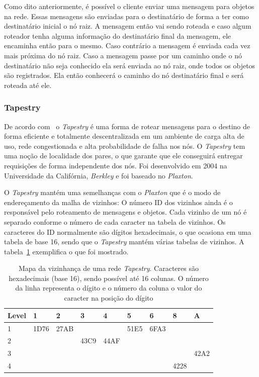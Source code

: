 Como dito anteriormente, é possível o cliente enviar uma mensagem para objetos na rede. Essas mensagens são enviadas para o destinatário de forma a ter como destinatário inicial o nó raiz. A mensagem então vai sendo roteada e caso algum roteador tenha alguma informação do destinatário final da mensagem, ele encaminha então para o mesmo. Caso contrário a mensagem é enviada cada vez mais próxima do nó raiz. Caso a mensagem passe por um caminho onde o nó destinatário não seja conhecido ela será enviada ao nó raiz, onde todos os objetos são registrados. Ela então conhecerá o caminho do nó destinatário final e será roteada até ele.

\subsubsection{Tapestry}

De acordo com~\cite{rowstron01} o \emph{Tapestry} é uma forma de rotear mensagens para o destino de forma eficiente e totalmente descentralizada em um ambiente de carga alta de uso, rede congestionada e alta probabilidade de falha nos nós. O \emph{Tapestry} tem uma noção de localidade dos pares, o que garante que ele conseguirá entregar requisições de forma independente dos nós. Foi desenvolvido em 2004 na Universidade da Califórnia, \emph{Berkley} e foi baseado no \emph{Plaxton}.

O \emph{Tapestry} mantém uma semelhanças com o \emph{Plaxton} que é o modo de endereçamento da malha de vizinhos: O número ID dos vizinhos ainda é o responsável pelo roteamento de mensagens e objetos. Cada vizinho de um nó é separado conforme o número de cada caracter na tabela de vizinhos. Os caracteres do ID normalmente são dígitos hexadecimais, o que ocasiona em uma tabela de base 16, sendo que o \emph{Tapestry} mantém várias tabelas de vizinhos. A tabela~\ref{mapa_vizinhaca_tapestry} exemplifica o que foi mostrado.

\begin{table}
	\begin{tabular}{|p{2cm} |p{1cm} |p{1cm} |p{1cm} |p{1cm} |p{1cm} |p{1cm} |p{1cm} |p{1cm}|}
		\hline
		\textbf{Level}	& \textbf{1} & \textbf{2} & \textbf{3}  & \textbf{4}  & \textbf{5}  & \textbf{6} & \textbf{8} & \textbf{A}	\\
		\hline
				1 		& 1D76 		 & 27AB 	  &  			&  			  &		51E5	&	6FA3	 &			  &	            \\
		\hline
				2 		& 	 		 & 		 	  &  43C9		&  	44AF	  &				&			 &			  &	            \\
		\hline
				3 		& 	 		 & 		 	  &  			&  			  &				&			 &			  &	   42A2     \\
		\hline
				4 		& 	 		 & 			  &  			&  			  &				&			 &		4228  &	            \\
		\hline
	\end{tabular}
	\caption{Mapa da vizinhança de uma rede \emph{Tapestry}. Caracteres são hexadecimais (base 16), sendo possível até 16 colunas. O número da linha representa o dígito e o número da coluna o valor do caracter na posição do dígito}
	\label{mapa_vizinhaca_tapestry}
\end{table}


